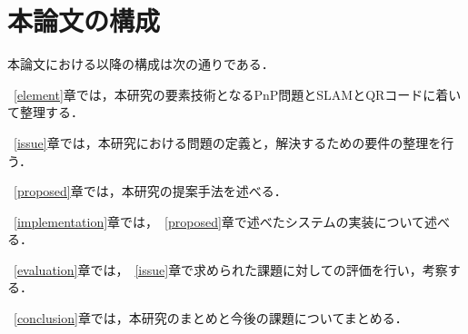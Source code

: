 \section{本論文の構成}

本論文における以降の構成は次の通りである．


~\ref{element}章では，本研究の要素技術となるPnP問題とSLAMとQRコードに着いて整理する．

~\ref{issue}章では，本研究における問題の定義と，解決するための要件の整理を行う．

~\ref{proposed}章では，本研究の提案手法を述べる．

~\ref{implementation}章では，~\ref{proposed}章で述べたシステムの実装について述べる．

~\ref{evaluation}章では，~\ref{issue}章で求められた課題に対しての評価を行い，考察する．

~\ref{conclusion}章では，本研究のまとめと今後の課題についてまとめる．
